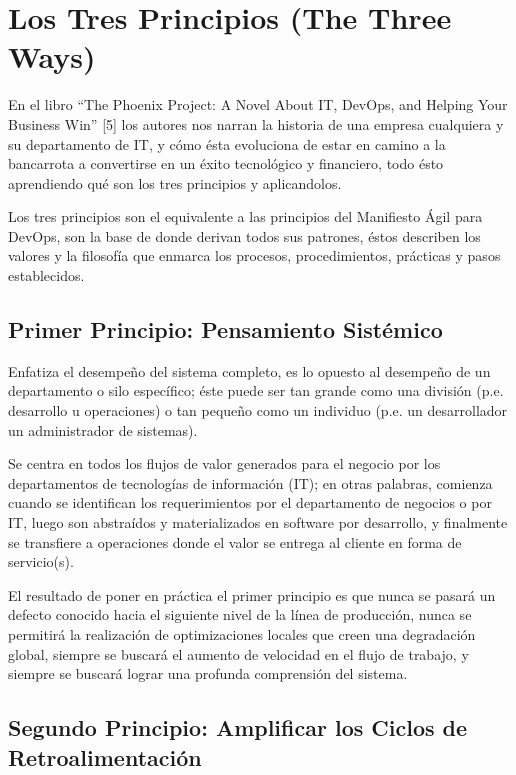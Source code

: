 \documentclass[conference]{IEEEtran}
\begin{document}
\section{Los Tres Principios (The Three Ways)}

En el libro “The Phoenix Project: A Novel About  IT, DevOps, and Helping Your Business Win” [5] los autores nos narran la historia de una empresa cualquiera y su departamento de IT, y cómo ésta evoluciona de estar en camino a la bancarrota a convertirse en un éxito tecnológico y financiero, todo ésto aprendiendo qué son los tres principios y aplicandolos.

Los tres principios son el equivalente a las principios del Manifiesto Ágil para DevOps, son la base de donde derivan todos sus patrones, éstos describen los valores y la filosofía que enmarca los procesos, procedimientos, prácticas y pasos establecidos.

\subsection{Primer Principio: Pensamiento Sistémico}

Enfatiza el desempeño del sistema completo, es lo opuesto al desempeño de un departamento o silo específico; éste puede ser tan grande como una división (p.e. desarrollo u operaciones) o tan pequeño como un individuo (p.e. un desarrollador un administrador de sistemas).

Se centra en todos los flujos de valor generados para el negocio por los departamentos de tecnologías de información (IT); en otras palabras, comienza cuando se identifican los requerimientos por el departamento de negocios o por IT, luego son abstraídos y materializados en software por desarrollo, y finalmente se transfiere a operaciones donde el valor se entrega al cliente en forma de servicio(s).

El resultado de poner en práctica el primer principio es que nunca se pasará un defecto conocido hacia el siguiente nivel de la línea de producción, nunca se permitirá la realización de optimizaciones locales que creen una degradación global, siempre se buscará el aumento de velocidad en el flujo de trabajo, y siempre se buscará lograr una profunda comprensión del sistema.

\subsection{Segundo Principio: Amplificar los Ciclos de Retroalimentación}
\end{document}
